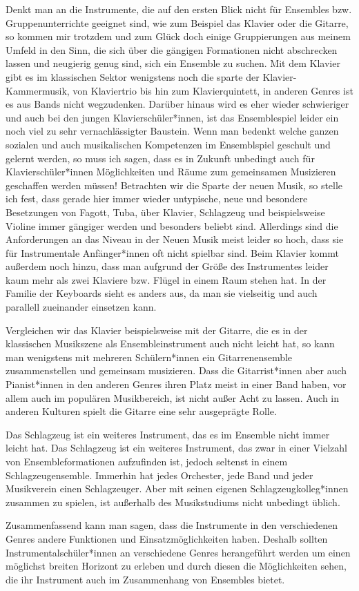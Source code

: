 Denkt man an die Instrumente, die auf den ersten Blick nicht für Ensembles bzw.
Gruppenunterrichte geeignet sind, wie zum Beispiel das Klavier oder die Gitarre,
so kommen mir trotzdem und zum Glück doch einige Gruppierungen aus meinem Umfeld
in den Sinn, die sich über die gängigen Formationen nicht abschrecken lassen und
neugierig genug sind, sich ein Ensemble zu suchen. Mit dem Klavier gibt es im
klassischen Sektor wenigstens noch die sparte der Klavier-Kammermusik, von
Klaviertrio bis hin zum Klavierquintett, in anderen Genres ist es aus Bands
nicht wegzudenken. Darüber hinaus wird es eher wieder schwieriger und auch bei
den jungen Klavierschüler*innen, ist das Ensemblespiel leider ein noch viel zu
sehr vernachlässigter Baustein. Wenn man bedenkt welche ganzen sozialen und auch
musikalischen Kompetenzen im Ensemblspiel geschult und gelernt werden, so muss
ich sagen, dass es in Zukunft unbedingt auch für Klavierschüler*innen
Möglichkeiten und Räume zum gemeinsamen Musizieren geschaffen werden müssen!
Betrachten wir die Sparte der neuen Musik, so stelle ich fest, dass gerade hier
immer wieder untypische, neue und besondere Besetzungen von Fagott, Tuba, über Klavier,
Schlagzeug und beispielsweise Violine immer gängiger werden und besonders beliebt
sind. Allerdings sind die Anforderungen an das Niveau in der Neuen Musik meist
leider so hoch, dass sie für Instrumentale Anfänger*innen oft nicht spielbar
sind. Beim Klavier kommt außerdem noch hinzu, dass man aufgrund der Größe des
Instrumentes leider kaum mehr als zwei Klaviere bzw. Flügel in einem Raum stehen
hat. In der Familie der Keyboards sieht es anders aus, da man sie vielseitig
und auch parallell zueinander einsetzen kann.

Vergleichen wir das Klavier beispielsweise mit der Gitarre, die es in der
klassischen Musikszene als Ensembleinstrument auch nicht leicht hat, so kann man
wenigstens mit mehreren Schülern*innen ein Gitarrenensemble zusammenstellen und
gemeinsam musizieren. Dass die Gitarrist*innen aber auch Pianist*innen in den
anderen Genres ihren Platz meist in einer Band haben, vor allem auch im
populären Musikbereich, ist nicht außer Acht zu lassen. Auch in anderen Kulturen
spielt die Gitarre eine sehr ausgeprägte Rolle.

Das Schlagzeug ist ein weiteres Instrument, das es im Ensemble nicht immer
leicht hat. Das Schlagzeug ist ein weiteres Instrument, das zwar in einer
Vielzahl von Ensembleformationen aufzufinden ist, jedoch seltenst in einem
Schlagzeugensemble. Immerhin hat jedes Orchester, jede Band und jeder
Musikverein einen Schlagzeuger. Aber mit seinen eigenen Schlagzeugkolleg*innen
zusammen zu spielen, ist außerhalb des Musikstudiums nicht unbedingt üblich. 

Zusammenfassend kann man sagen, dass die Instrumente in den verschiedenen Genres
andere Funktionen und Einsatzmöglichkeiten haben. Deshalb sollten
Instrumentalschüler*innen an verschiedene Genres herangeführt werden um einen
möglichst breiten Horizont zu erleben und durch diesen die Möglichkeiten sehen,
die ihr Instrument auch im Zusammenhang von Ensembles bietet. 






